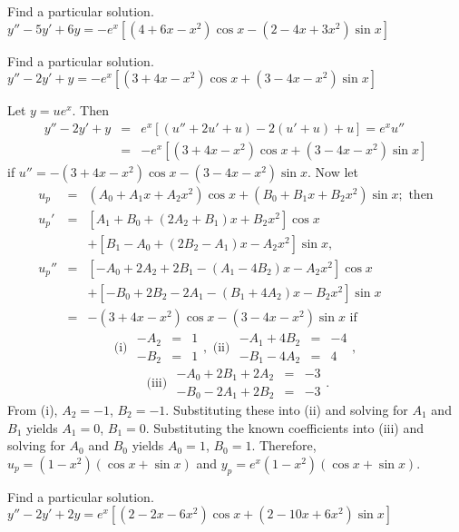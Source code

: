 \documentclass{ximera}
\begin{document}
\begin{problem}\label{exer:5.5.15}
Find a particular solution. $y''-5y'+6y=-e^x\left[(4+6x-x^2)\cos x-(2-4x+3x^2)\sin x\right]$
\end{problem}

\begin{problem}\label{exer:5.5.16}
Find a particular solution. $y''-2y'+y=-e^x\left[(3+4x-x^2)\cos x+(3-4x-x^2)\sin x\right]$

\begin{solution}
    Let $y=ue^x$. Then
\begin{eqnarray*}
y''-2y'+y&=&e^x\left[(u''+2u'+u)-2(u'+u)+u\right]=e^xu''\\
&=&-e^x\left[(3+4x-x^2)\cos x+(3-4x-x^2)\sin x\right]
\end{eqnarray*}
 if $u''=-(3+4x-x^2)\cos x-(3-4x-x^2)\sin x$.
Now let
\begin{eqnarray*}
u_p&=&(A_0+A_1x+A_2x^2)\cos x +(B_0+B_1x+B_2x^2)\sin x;\mbox{ then}\\
u_p'&=&\left[A_1+B_0+(2A_2+B_1)x+B_2x^2\right]\cos x\\ &&
+\left[B_1-A_0+(2B_2-A_1)x-A_2x^2\right]\sin x, \\
u_p ''&=&\left[-A_0+2A_2+2B_1-(A_1-4B_2)x-A_2x^2\right]\cos x\\ &&+
\left[-B_0+2B_2-2A_1-(B_1+4A_2)x-B_2x^2\right]\sin x\\
&=&-(3+4x-x^2)\cos x-(3-4x-x^2)\sin x\mbox{ if }
\end{eqnarray*}
$$
\mbox{(i) } \begin{array}{rcl}-A_2&=&1\\ -B_2&=&1 \end{array},
\mbox{ (ii) } \begin{array}{rcr} -A_1+4B_2&=&-4
\\ -B_1-4A_2&=&4\end{array},
$$
$$
\mbox{ (iii) }
\begin{array}{rcr}-A_0+2B_1+2A_2&=&-3
\\ -B_0-2A_1+2B_2&=&-3\end{array}.
$$
From (i), $A_2=-1$, $B_2=-1$. Substituting these into (ii) and solving
for $A_1$ and $B_1$ yields $A_1=0$, $B_1=0$. Substituting the known
coefficients into (iii) and solving for $A_0$ and $B_0$ yields
$A_0=1$, $B_0=1$. Therefore,$u_p=(1-x^2)(\cos x+\sin x)$ and
$y_p=e^x(1-x^2)(\cos x+\sin x)$.
\end{solution}
\end{problem}

\begin{problem}\label{exer:5.5.17}
Find a particular solution. $y''-2y'+2y=e^x\left[(2-2x-6x^2)\cos x+(2-10x+6x^2)\sin x\right]$
\end{problem}
\end{document}
